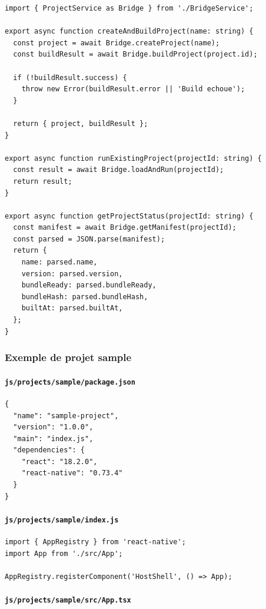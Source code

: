 \documentclass[11pt]{article}
\begin{document}
\begin{verbatim}
import { ProjectService as Bridge } from './BridgeService';

export async function createAndBuildProject(name: string) {
  const project = await Bridge.createProject(name);
  const buildResult = await Bridge.buildProject(project.id);

  if (!buildResult.success) {
    throw new Error(buildResult.error || 'Build echoue');
  }

  return { project, buildResult };
}

export async function runExistingProject(projectId: string) {
  const result = await Bridge.loadAndRun(projectId);
  return result;
}

export async function getProjectStatus(projectId: string) {
  const manifest = await Bridge.getManifest(projectId);
  const parsed = JSON.parse(manifest);
  return {
    name: parsed.name,
    version: parsed.version,
    bundleReady: parsed.bundleReady,
    bundleHash: parsed.bundleHash,
    builtAt: parsed.builtAt,
  };
}
\end{verbatim}

\subsubsection*{Exemple de projet sample}

\paragraph{\texttt{js/projects/sample/package.json}}

\begin{verbatim}
{
  "name": "sample-project",
  "version": "1.0.0",
  "main": "index.js",
  "dependencies": {
    "react": "18.2.0",
    "react-native": "0.73.4"
  }
}
\end{verbatim}

\paragraph{\texttt{js/projects/sample/index.js}}

\begin{verbatim}
import { AppRegistry } from 'react-native';
import App from './src/App';

AppRegistry.registerComponent('HostShell', () => App);
\end{verbatim}

\paragraph{\texttt{js/projects/sample/src/App.tsx}}
\end{document}
